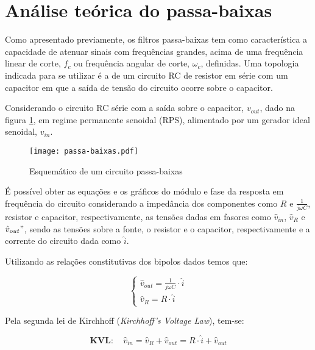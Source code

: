 \section{Análise teórica do passa-baixas}
  Como apresentado previamente, os filtros passa-baixas tem como característica a capacidade de atenuar sinais com frequências grandes, acima de uma frequência linear de corte, $f_c$ ou frequência angular de corte, $\omega_c$, definidas. Uma topologia indicada para se utilizar é a de um circuito RC de resistor em série com um capacitor em que a saída de tensão do circuito ocorre sobre o capacitor.

  Considerando o circuito RC série com a saída sobre o capacitor, $v_{out}$, dado na figura \ref{fig:esquematico_passa_baixas}, em regime permanente senoidal (RPS), alimentado por um gerador ideal senoidal, $v_{in}$.

  \begin{figure}[H]
    \centering
    \caption{Esquemático de um circuito passa-baixas}
    \texttt{[image: passa-baixas.pdf]}
    \label{fig:esquematico_passa_baixas}
  \end{figure}

  É possível obter as equações e os gráficos do módulo e fase da resposta em frequência do circuito considerando a impedância dos componentes como $R$ e $\frac{1}{j \omega C}$, resistor e capacitor, respectivamente, as tensões dadas em fasores como $\hat{v}_{in}$, $\hat{v}_{R}$ e $\hat{v}_{out}"$, sendo as tensões sobre a fonte, o resistor e o capacitor, respectivamente e a corrente do circuito dada como $\hat{i}$.

  Utilizando as relações constitutivas dos bipolos dados temos que:

  \begin{equation*}
    \begin{cases}
      \hat{v}_{out} = \frac{1}{j \omega C} \cdot \hat{i} \\
      \hat{v}_{R} = R \cdot \hat{i}
    \end{cases}
  \end{equation*}

  Pela segunda lei de Kirchhoff (\textit{Kirchhoff's Voltage Law}), tem-se:

  \begin{equation} 
    \mathbf{KVL:} \quad \hat{v}_{in} = \hat{v}_{R} + \hat{v}_{out} = R \cdot \hat{i} + \hat{v}_{out}
    \label{eq:kvl_passa_baixas}
  \end{equation}

